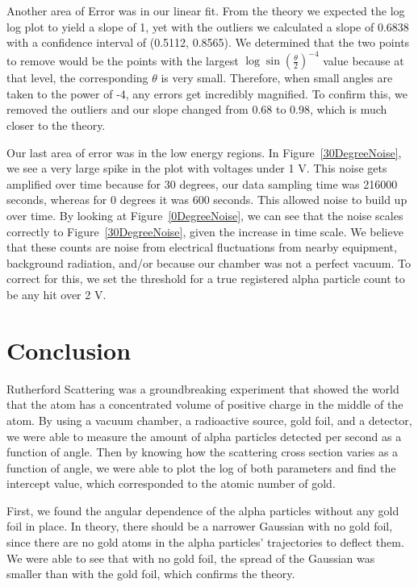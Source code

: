 Another area of Error was in our linear fit. From the theory we expected the log log plot to yield a slope of 1, yet with the outliers we calculated a slope of 0.6838 with a confidence interval of (0.5112, 0.8565). We determined that the two points to remove would be the points with the largest $\log{\sin(\frac{\theta}{2})^{-4}}$ value because at that level, the corresponding $\theta$ is very small. Therefore, when small angles are taken to the power of -4, any errors get incredibly magnified. To confirm this, we removed the outliers and our slope changed from 0.68 to 0.98, which is much closer to the theory. 

Our last area of error was in the low energy regions. In Figure~\ref{30DegreeNoise}, we see a very large spike in the plot with voltages under 1 V. This noise gets amplified over time because for 30 degrees, our data sampling time was 216000 seconds, whereas for 0 degrees it was 600 seconds. This allowed noise to build up over time. By looking at Figure~\ref{0DegreeNoise}, we can see that the noise scales correctly to Figure~\ref{30DegreeNoise}, given the increase in time scale. We believe that these counts are noise from electrical fluctuations from nearby equipment, background radiation, and/or because our chamber was not a perfect vacuum. To correct for this, we set the threshold for a true registered alpha particle count to be any hit over 2 V.  

\section{Conclusion}

Rutherford Scattering was a groundbreaking experiment that showed the world that the atom has a concentrated volume of positive charge in the middle of the atom. By using a vacuum chamber, a radioactive source, gold foil, and a detector, we were able to measure the amount of alpha particles detected per second as a function of angle. Then by knowing how the scattering cross section varies as a function of angle, we were able to plot the log of both parameters and find the intercept value, which corresponded to the atomic number of gold. 

First, we found the angular dependence of the alpha particles without any gold foil in place. In theory, there should be a narrower Gaussian with no gold foil, since there are no gold atoms in the alpha particles' trajectories to deflect them. We were able to see that with no gold foil, the spread of the Gaussian was smaller than with the gold foil, which confirms the theory. 


